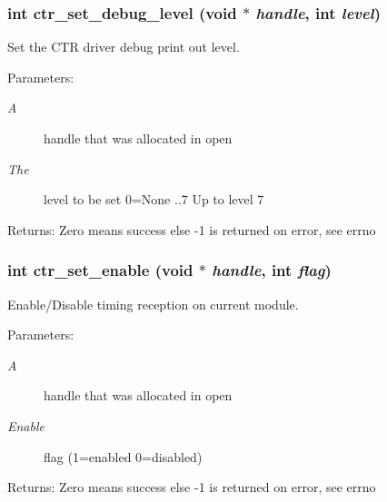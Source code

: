 \subsubsection{\setlength{\rightskip}{0pt plus 5cm}int ctr\_\-set\_\-debug\_\-level (void $\ast$ {\em handle}, int {\em level})}\label{libctr_8doxygen_68fe0a707265a45a27b630f9d81399cd}


Set the CTR driver debug print out level. 

\begin{Desc}
\item[Parameters:]
\begin{description}
\item[{\em A}]handle that was allocated in open \item[{\em The}]level to be set 0=None ..7 Up to level 7 \end{description}
\end{Desc}
\begin{Desc}
\item[Returns:]Zero means success else -1 is returned on error, see errno \end{Desc}
\subsubsection{\setlength{\rightskip}{0pt plus 5cm}int ctr\_\-set\_\-enable (void $\ast$ {\em handle}, int {\em flag})}\label{libctr_8doxygen_fc811c9a87dfe440c7226dd710af0ae1}


Enable/Disable timing reception on current module. 

\begin{Desc}
\item[Parameters:]
\begin{description}
\item[{\em A}]handle that was allocated in open \item[{\em Enable}]flag (1=enabled 0=disabled) \end{description}
\end{Desc}
\begin{Desc}
\item[Returns:]Zero means success else -1 is returned on error, see errno \end{Desc}
